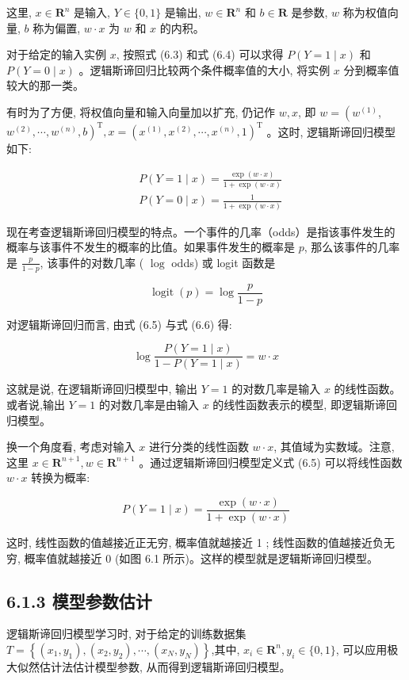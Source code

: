 \documentclass[10pt]{article}
\begin{document}
\begin{CJK*}{UTF8}{bsmi}
这里, $x \in \boldsymbol{R}^{n}$ 是输入, $Y \in\{0,1\}$ 是输出, $w \in \boldsymbol{R}^{n}$ 和 $b \in \boldsymbol{R}$ 是参数, $w$ 称为权值向量, $b$ 称为偏置, $w \cdot x$ 为 $w$ 和 $x$ 的内积。

对于给定的输入实例 $x$, 按照式 (6.3) 和式 (6.4) 可以求得 $P(Y=1 \mid x)$ 和 $P(Y=0 \mid x)$ 。逻辑斯谛回归比较两个条件概率值的大小, 将实例 $x$ 分到概率值较大的那一类。

有时为了方便, 将权值向量和输入向量加以扩充, 仍记作 $w, x$, 即 $w=\left(w^{(1)}\right.$, $\left.w^{(2)}, \cdots, w^{(n)}, b\right)^{\mathrm{T}}, x=\left(x^{(1)}, x^{(2)}, \cdots, x^{(n)}, 1\right)^{\mathrm{T}}$ 。这时, 逻辑斯谛回归模型如下:


\begin{align*}
& P(Y=1 \mid x)=\frac{\exp (w \cdot x)}{1+\exp (w \cdot x)}  \tag{6.5}\\
& P(Y=0 \mid x)=\frac{1}{1+\exp (w \cdot x)} \tag{6.6}
\end{align*}


现在考查逻辑斯谛回归模型的特点。一个事件的几率（odds）是指该事件发生的概率与该事件不发生的概率的比值。如果事件发生的概率是 $p$, 那么该事件的几率是 $\frac{p}{1-p}$, 该事件的对数几率 ( $\log$ odds) 或 logit 函数是

$$
\operatorname{logit}(p)=\log \frac{p}{1-p}
$$

对逻辑斯谛回归而言, 由式 (6.5) 与式 (6.6) 得:

$$
\log \frac{P(Y=1 \mid x)}{1-P(Y=1 \mid x)}=w \cdot x
$$

这就是说, 在逻辑斯谛回归模型中, 输出 $Y=1$ 的对数几率是输入 $x$ 的线性函数。或者说,输出 $Y=1$ 的对数几率是由输入 $x$ 的线性函数表示的模型, 即逻辑斯谛回归模型。

换一个角度看, 考虑对输入 $x$ 进行分类的线性函数 $w \cdot x$, 其值域为实数域。注意, 这里 $x \in \boldsymbol{R}^{n+1}, w \in \boldsymbol{R}^{n+1}$ 。通过逻辑斯谛回归模型定义式 (6.5) 可以将线性函数 $w \cdot x$ 转换为概率:

$$
P(Y=1 \mid x)=\frac{\exp (w \cdot x)}{1+\exp (w \cdot x)}
$$

这时, 线性函数的值越接近正无穷, 概率值就越接近 1 ; 线性函数的值越接近负无穷, 概率值就越接近 0 (如图 6.1 所示)。这样的模型就是逻辑斯谛回归模型。

\subsection*{6.1.3 模型参数估计}
逻辑斯谛回归模型学习时, 对于给定的训练数据集 $T=\left\{\left(x_{1}, y_{1}\right),\left(x_{2}, y_{2}\right), \cdots,\left(x_{N}, y_{N}\right)\right\}$,其中, $x_{i} \in \boldsymbol{R}^{n}, y_{i} \in\{0,1\}$, 可以应用极大似然估计法估计模型参数, 从而得到逻辑斯谛回归模型。


\end{CJK*}
\end{document}
